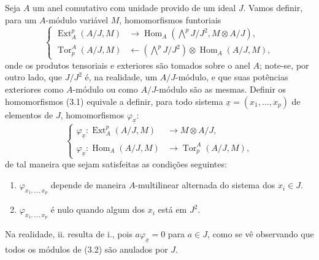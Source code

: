 Seja $A$ um anel comutativo com unidade provido de um ideal $J$. Vamos
definir, para um $A$-módulo variável $M$, homomorfismos funtoriais
\begin{equation}\tag{3.1}
\left\{
\begin{aligned}
\operatorname{Ext}_{A}^{p}(A/J,M)
  &\longrightarrow
  \operatorname{Hom}_{A}\!\left(\bigwedge^{p}J/J^{2},M\otimes A/J\right),\\
\operatorname{Tor}_{p}^{A}(A/J,M)
  &\longleftarrow
  \left(\bigwedge^{p}J/J^{2}\right)
  \otimes\operatorname{Hom}_{A}(A/J,M),
\end{aligned}
\right.
\end{equation}
onde os produtos tensoriais e exteriores são tomados sobre o anel $A$; note-se,
por outro lado, que $J/J^{2}$ é, na realidade, um $A/J$-módulo, e que suas potências
exteriores como $A$-módulo ou como $A/J$-módulo são as mesmas.
Definir os homomorfismos (3.1) equivale a definir, para todo
sistema $\underline{x}=(x_1,\ldots,x_p)$ de elementos de $J$, homomorfismos
$\varphi_{\underline{x}}$:
\begin{equation}\tag{3.2}
\left\{
\begin{aligned}
\varphi_{\underline{x}}:
  \operatorname{Ext}_{A}^{p}(A/J,M)&\longrightarrow M\otimes A/J,\\
\varphi_{\underline{x}}:
  \operatorname{Hom}_{A}(A/J,M)&\longrightarrow
  \operatorname{Tor}_{p}^{A}(A/J,M),
\end{aligned}
\right.
\end{equation}
de tal maneira que sejam satisfeitas as condições seguintes:

\begin{enumerate}
\item[\textup{i.}] $\varphi_{x_1,\ldots,x_p}$ depende de maneira
$A$-multilinear alternada do sistema dos $x_i\in J$.
\item[\textup{ii.}] $\varphi_{x_1,\ldots,x_p}$ é nulo quando algum dos $x_i$ está
em $J^{2}$.
\end{enumerate}
Na realidade, ii. resulta de i., pois $a\varphi_{\underline{x}}=0$ para $a\in J$,
como se vê observando que todos os módulos de (3.2) são anulados por
$J$.

